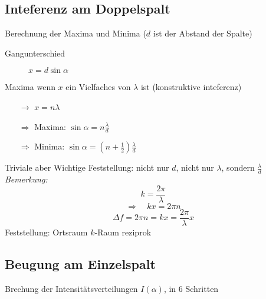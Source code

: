 \subsection{Inteferenz am Doppelspalt}

Berechnung der Maxima und Minima ($ d $ ist der Abstand der Spalte)
\begin{description}
	\item[Gangunterschied] $x = d \sin \alpha$
\end{description}
Maxima wenn $x$ ein Vielfaches von $\lambda$ ist (konstruktive inteferenz)
\begin{itemize}
	\item[$\rightarrow$] $x = n \lambda$
	\item[$\Rightarrow$] Maxima: $\sin\alpha = n \frac{\lambda}{d}$
	\item[$\Rightarrow$] Minima: $\sin\alpha = \left(n + \frac{1}{2}\right)\frac{\lambda}{d}$
\end{itemize}
Triviale aber Wichtige Feststellung: nicht nur $d$, nicht nur $\lambda$, sondern $\frac{\lambda}{d}$\\
\emph{Bemerkung: } $$k= \frac{2\pi}{\lambda}$$
$$\Rightarrow \quad kx = 2 \pi n$$
$$\Delta f = 2\pi n = kx = \frac{2 \pi}{\lambda}x$$
Feststellung: Ortsraum $k$-Raum reziprok 
%
%
%
%
%
%
\subsection{Beugung am Einzelspalt}

Brechung der Intensitätsverteilungen $ I(\alpha) $, in 6 Schritten

